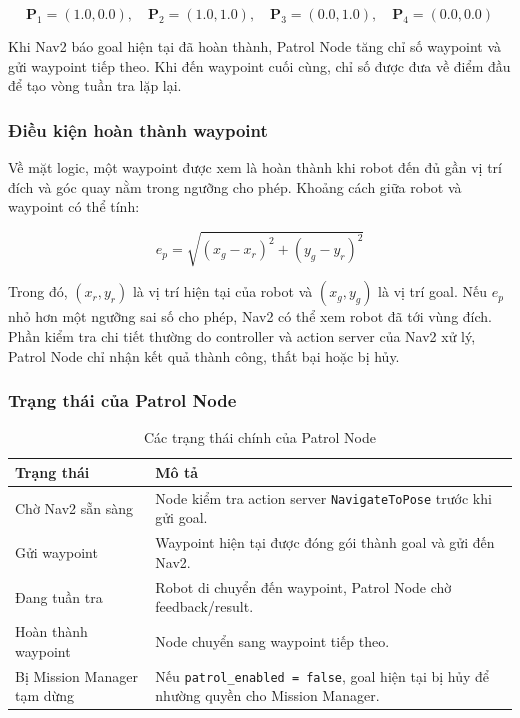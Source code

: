 \begin{equation}
    \mathbf{P}_1=(1.0,0.0),\quad
    \mathbf{P}_2=(1.0,1.0),\quad
    \mathbf{P}_3=(0.0,1.0),\quad
    \mathbf{P}_4=(0.0,0.0)
    \label{eq:patrol-waypoint-list}
\end{equation}

Khi Nav2 báo goal hiện tại đã hoàn thành, Patrol Node tăng chỉ số waypoint và gửi waypoint tiếp theo. Khi đến waypoint cuối cùng, chỉ số được đưa về điểm đầu để tạo vòng tuần tra lặp lại.

\subsubsection{Điều kiện hoàn thành waypoint}
\label{subsubsec:waypoint-completion}

Về mặt logic, một waypoint được xem là hoàn thành khi robot đến đủ gần vị trí đích và góc quay nằm trong ngưỡng cho phép. Khoảng cách giữa robot và waypoint có thể tính:

\begin{equation}
    e_p
    =
    \sqrt{(x_g-x_r)^2+(y_g-y_r)^2}
    \label{eq:waypoint-position-error}
\end{equation}

Trong đó, $(x_r,y_r)$ là vị trí hiện tại của robot và $(x_g,y_g)$ là vị trí goal. Nếu $e_p$ nhỏ hơn một ngưỡng sai số cho phép, Nav2 có thể xem robot đã tới vùng đích. Phần kiểm tra chi tiết thường do controller và action server của Nav2 xử lý, Patrol Node chỉ nhận kết quả thành công, thất bại hoặc bị hủy.

\subsubsection{Trạng thái của Patrol Node}
\label{subsubsec:patrol-node-states}

\begin{table}[H]
    \centering
    \caption{Các trạng thái chính của Patrol Node}
    \label{tab:patrol-node-states}
    \renewcommand{\arraystretch}{1.25}
    \small
    \begin{tabularx}{\textwidth}{|>{\raggedright\arraybackslash}p{}|>{\raggedright\arraybackslash}X|}
        \hline
        \textbf{Trạng thái} & \textbf{Mô tả} \\
        \hline
        Chờ Nav2 sẵn sàng & Node kiểm tra action server \texttt{NavigateToPose} trước khi gửi goal. \\
        \hline
        Gửi waypoint & Waypoint hiện tại được đóng gói thành goal và gửi đến Nav2. \\
        \hline
        Đang tuần tra & Robot di chuyển đến waypoint, Patrol Node chờ feedback/result. \\
        \hline
        Hoàn thành waypoint & Node chuyển sang waypoint tiếp theo. \\
        \hline
        Bị Mission Manager tạm dừng & Nếu \texttt{patrol\_enabled = false}, goal hiện tại bị hủy để nhường quyền cho Mission Manager. \\
        \hline
    \end{tabularx}
\end{table}

